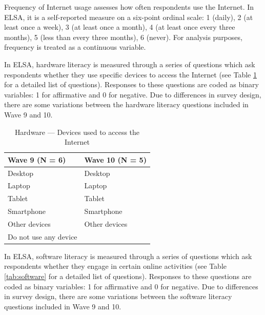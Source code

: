 Frequency of Internet usage assesses how often respondents use the Internet. In ELSA, it is a self-reported measure on a six-point ordinal scale: 1 (daily), 2 (at least once a week), 3 (at least once a month), 4 (at least once every three months), 5 (less than every three months), 6 (never). For analysis purposes, frequency is treated as a continuous variable.

In ELSA, hardware literacy is measured through a series of questions which ask respondents whether they use specific devices to access the Internet (see Table \ref{tab:hardware} for a detailed list of questions). Responses to these questions are coded as binary variables: 1 for affirmative and 0 for negative. Due to differences in survey design, there are some variations between the hardware literacy questions included in Wave 9 and 10. 

\begin{table}[h!]
    \centering
    \caption{Hardware --- Devices used to access the Internet}
    \label{tab:hardware}
    \begin{tabular}{ll}
        \toprule
        Wave 9 (N = 6) & Wave 10 (N = 5) \\
        \midrule
        Desktop & Desktop \\
        Laptop & Laptop \\
        Tablet & Tablet \\
        Smartphone & Smartphone \\
        Other devices & Other devices \\
        Do not use any device & \\
        \bottomrule
    \end{tabular}
\end{table}

In ELSA, software literacy is measured through a series of questions which ask respondents whether they engage in certain online activities (see Table \ref{tab:software} for a detailed list of questions). Responses to these questions are coded as binary variables: 1 for affirmative and 0 for negative. Due to differences in survey design, there are some variations between the software literacy questions included in Wave 9 and 10.

